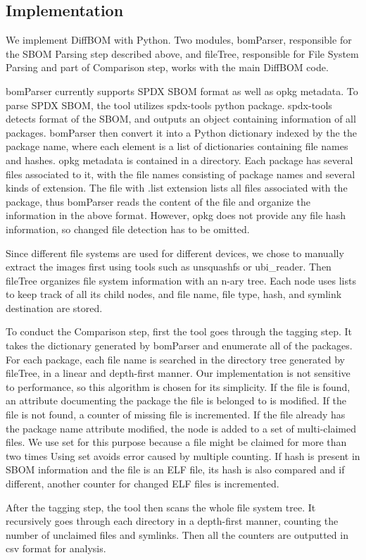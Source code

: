 \subsection{Implementation}
We implement DiffBOM with Python. Two modules, bomParser, responsible for the SBOM Parsing step described above, and fileTree, responsible for File System Parsing and part of Comparison step, works with the main DiffBOM code.\par
bomParser currently supports SPDX SBOM format as well as opkg metadata. To parse SPDX SBOM, the tool utilizes spdx-tools python package. spdx-tools detects format of the SBOM, and outputs an object containing information of all packages. bomParser then convert it into a Python dictionary indexed by the the package name, where each element is a list of dictionaries containing file names and hashes. opkg metadata is contained in a directory. Each package has several files associated to it, with the file names consisting of package names and several kinds of extension. The file with .list extension lists all files associated with the package, thus bomParser reads the content of the file and organize the information in the above format. However, opkg does not provide any file hash information, so changed file detection has to be omitted.\par
Since different file systems are used for different devices, we chose to manually extract the images first using tools such as unsquashfs or ubi\_reader. Then fileTree organizes file system information with an n-ary tree. Each node uses lists to keep track of all its child nodes, and file name, file type, hash, and symlink destination are stored.\par
To conduct the Comparison step, first the tool goes through the tagging step. It takes the dictionary generated by bomParser and enumerate all of the packages. For each package, each file name is searched in the directory tree generated by fileTree, in a linear and depth-first manner. Our implementation is not sensitive to performance, so this algorithm is chosen for its simplicity. If the file is found, an attribute documenting the package the file is belonged to is modified. If the file is not found, a counter of missing file is incremented. If the file already has the package name attribute modified, the node is added to a set of multi-claimed files. We use set for this purpose because a file might be claimed for more than two times Using set avoids error caused by multiple counting. If hash is present in SBOM information and the file is an ELF file, its hash is also compared and if different, another counter for changed ELF files is incremented.\par
After the tagging step, the tool then scans the whole file system tree. It recursively goes through each directory in a depth-first manner, counting the number of unclaimed files and symlinks. Then all the counters are outputted in csv format for analysis.

